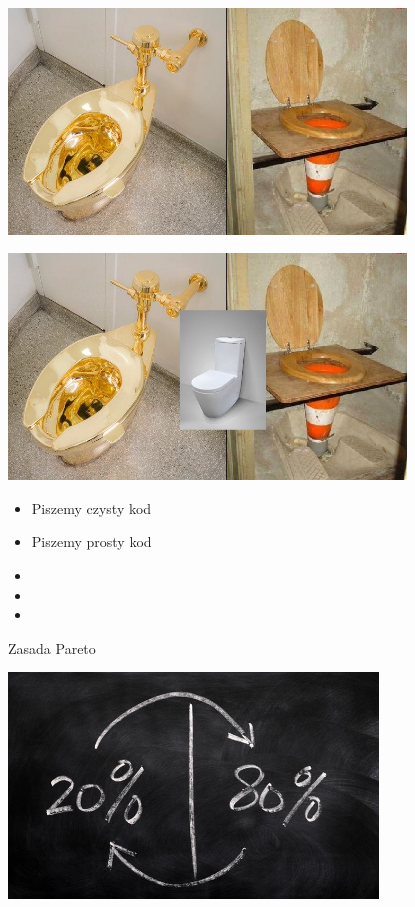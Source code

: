 \documentclass{beamer}
\begin{document}
\begin{frame}{}
\begin{center}
  	\includegraphics[height=6cm]{prosty_kod1.jpg}
\end{center}
\end{frame}

\begin{frame}{}
\begin{center}
  	\includegraphics[height=6cm]{prosty_kod2.jpg}
\end{center}
\end{frame}

\begin{frame}{}
     \begin{Large}
	\begin{itemize}
		\item Piszemy czysty kod
		\item Piszemy prosty kod
		\item 
		\item 
		\item 
	\end{itemize}
     \end{Large}
\end{frame}

\begin{frame}{Zasada Pareto}
\begin{center}
  	\includegraphics[height=6cm]{pareto.jpg}
\end{center}
\end{frame}
\end{document}
